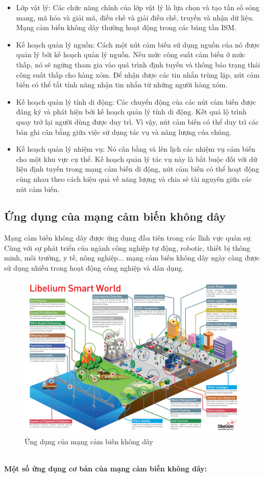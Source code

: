 \documentclass{report}
\begin{document}
\begin{itemize}
\item Lớp vật lý: Các chức năng chính của lớp vật lý là lựa chọn và tạo tần số sóng mang, mã hóa và giải mã, điều chế và giải điều chế, truyền và nhận dữ liệu. Mạng cảm biến không dây thường hoạt động trong các băng tần ISM.
\item Kế hoạch quản lý nguồn: Cách một nút cảm biến sử dụng nguồn của nó được quản lý bởi kế hoạch quản lý nguồn. Nếu mức công suất cảm biến ở mức thấp, nó sẽ ngừng tham gia vào quá trình định tuyến và thông báo trạng thái công suất thấp cho hàng xóm. Để nhận được các tin nhắn trùng lặp, nút cảm biến có thể tắt tính năng nhận tin nhắn từ những người hàng xóm.
\item Kế hoạch quản lý tính di động: Các chuyển động của các nút cảm biến được đăng ký và phát hiện bởi kế hoạch quản lý tính di động. Kết quả lộ trình quay trở lại người dùng được duy trì. Vì vậy, nút cảm biến có thể duy trì các bản ghi cân bằng giữa việc sử dụng tác vụ và năng lượng của chúng.
\item Kế hoạch quản lý nhiệm vụ: Nó cân bằng và lên lịch các nhiệm vụ cảm biến cho một khu vực cụ thể. Kế hoạch quản lý tác vụ này là bắt buộc đối với dữ liệu định tuyến trong mạng cảm biến di động, nút cảm biến có thể hoạt động cùng nhau theo cách hiệu quả về năng lượng và chia sẻ tài nguyên giữa các nút cảm biến.
\end{itemize}
\subsection{Ứng dụng của mạng cảm biến không dây}
Mạng cảm biến không dây được ứng dụng đầu tiên trong các lĩnh vực quân sự. Cùng với
sự phát triển của ngành công nghiệp tự động, robotic, thiết bị thông minh, môi trường, y tế,
nông nghiệp... mạng cảm biến không dây ngày càng được sử dụng nhiều trong hoạt động công
nghiệp và dân dụng.
\begin{figure}[h]
	\centering
	\includegraphics[scale = 0.5]{fig5.png}
	\caption{Ứng dụng của mạng cảm biến không dây}
	\label{fig:Graph5}
\end{figure}\\
\newpage
\noindent
\textbf{Một số ứng dụng cơ bản của mạng cảm biến không dây:} \\
\end{document}
